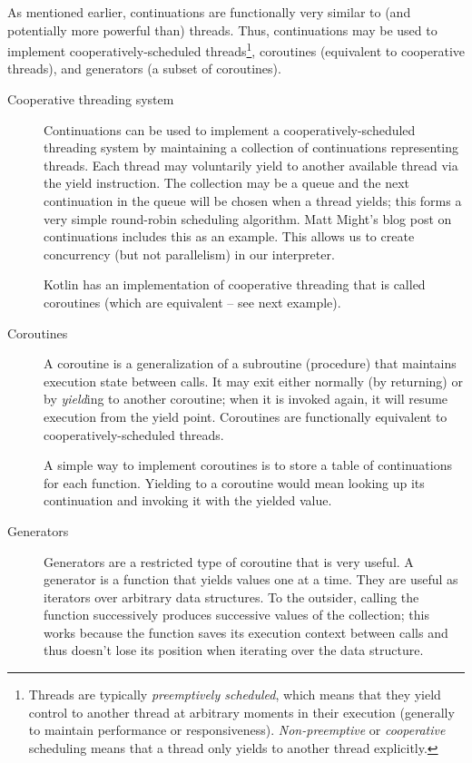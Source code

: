 \documentclass[]{article}
\begin{document}
As mentioned earlier, continuations are functionally very similar to (and potentially more powerful than) threads. Thus, continuations may be used to implement cooperatively-scheduled threads\footnote{Threads are typically \textit{preemptively scheduled}, which means that they yield control to another thread at arbitrary moments in their execution (generally to maintain performance or responsiveness). \textit{Non-preemptive} or \textit{cooperative} scheduling means that a thread only yields to another thread explicitly.}, coroutines (equivalent to cooperative threads), and generators (a subset of coroutines).

\begin{description}
  
\item[Cooperative threading system] Continuations can be used to implement a cooperatively-scheduled threading system by maintaining a collection of continuations representing threads. Each thread may voluntarily yield to another available thread via the yield instruction. The collection may be a queue and the next continuation in the queue will be chosen when a thread yields; this forms a very simple round-robin scheduling algorithm. Matt Might's blog post on continuations includes this as an example. This allows us to create concurrency (but not parallelism) in our interpreter.

  Kotlin has an implementation of cooperative threading that is called coroutines (which are equivalent -- see next example).
  
\item[Coroutines] A coroutine is a generalization of a subroutine (procedure) that maintains execution state between calls. It may exit either normally (by returning) or by \textit{yield}ing to another coroutine; when it is invoked again, it will resume execution from the yield point. Coroutines are functionally equivalent to cooperatively-scheduled threads.

  A simple way to implement coroutines is to store a table of continuations for each function. Yielding to a coroutine would mean looking up its continuation and invoking it with the yielded value.
  
\item[Generators] Generators are a restricted type of coroutine that is very useful. A generator is a function that yields values one at a time. They are useful as iterators over arbitrary data structures. To the outsider, calling the function successively produces successive values of the collection; this works because the function saves its execution context between calls and thus doesn't lose its position when iterating over the data structure.


\end{description}
\end{document}

